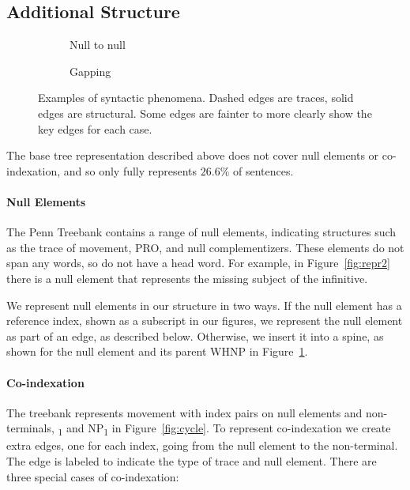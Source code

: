 \subsection{Additional Structure} \label{sec:rep-other}

\begin{figure}
\begin{subfigure}[b]{0.38\textwidth}
  \centering
  \scalebox{0.9}{}
  \caption{\label{fig:null-null}
    Null to null
  }
\end{subfigure}
\hfill
\begin{subfigure}[b]{0.52\textwidth}
  \centering
  \scalebox{0.9}{}
  \caption{\label{fig:gapping}
    Gapping
  }
\end{subfigure}
\caption[Examples of graph structured syntactic phenomena.]{
Examples of syntactic phenomena.
Dashed edges are traces, solid edges are structural.
Some edges are fainter to more clearly show the key edges for each case.
}
\end{figure}

The base tree representation described above does not cover null elements or co-indexation, and so only fully represents $26.6\%$ of sentences.

\paragraph{Null Elements}
The Penn Treebank contains a range of null elements, indicating structures such as the trace of movement, PRO, and null complementizers.
These elements do not span any words, so do not have a head word.
For example, in Figure~\ref{fig:repr2} there is a null element that represents the missing subject of the infinitive.

We represent null elements in our structure in two ways.
If the null element has a reference index, shown as a subscript in our figures, we represent the null element as part of an edge, as described below.
Otherwise, we insert it into a spine, as shown for the null element and its parent WHNP in Figure~\ref{fig:null-null}.

\paragraph{Co-indexation}
The treebank represents movement with index pairs on null elements and non-terminals, \myeg *\textsubscript{1} and NP\textsubscript{1} in Figure~\ref{fig:cycle}.
To represent co-indexation we create extra edges, one for each index, going from the null element to the non-terminal.
The edge is labeled to indicate the type of trace and null element.
There are three special cases of co-indexation:

